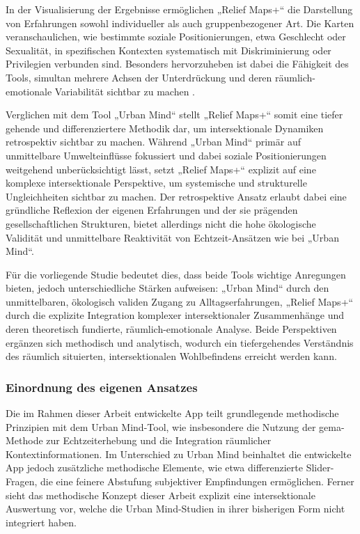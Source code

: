 In der Visualisierung der Ergebnisse ermöglichen „Relief Maps+“ die Darstellung von Erfahrungen sowohl individueller als auch gruppenbezogener Art. Die Karten veranschaulichen, wie bestimmte soziale Positionierungen, etwa Geschlecht oder Sexualität, in spezifischen Kontexten systematisch mit Diskriminierung oder Privilegien verbunden sind. Besonders hervorzuheben ist dabei die Fähigkeit des Tools, simultan mehrere Achsen der Unterdrückung und deren räumlich-emotionale Variabilität sichtbar zu machen \parencite{rodo-de-zarateDevelopingGeographiesIntersectionality2014}.

Verglichen mit dem Tool „Urban Mind“ stellt „Relief Maps+“ somit eine tiefer gehende und differenziertere Methodik dar, um intersektionale Dynamiken retrospektiv sichtbar zu machen. Während „Urban Mind“ primär auf unmittelbare Umwelteinflüsse fokussiert und dabei soziale Positionierungen weitgehend unberücksichtigt lässt, setzt „Relief Maps+“ explizit auf eine komplexe intersektionale Perspektive, um systemische und strukturelle Ungleichheiten sichtbar zu machen. Der retrospektive Ansatz erlaubt dabei eine gründliche Reflexion der eigenen Erfahrungen und der sie prägenden gesellschaftlichen Strukturen, bietet allerdings nicht die hohe ökologische Validität und unmittelbare Reaktivität von Echtzeit-Ansätzen wie bei „Urban Mind“.

Für die vorliegende Studie bedeutet dies, dass beide Tools wichtige Anregungen bieten, jedoch unterschiedliche Stärken aufweisen: „Urban Mind“ durch den unmittelbaren, ökologisch validen Zugang zu Alltagserfahrungen, „Relief Maps+“ durch die explizite Integration komplexer intersektionaler Zusammenhänge und deren theoretisch fundierte, räumlich-emotionale Analyse. Beide Perspektiven ergänzen sich methodisch und analytisch, wodurch ein tiefergehendes Verständnis des räumlich situierten, intersektionalen Wohlbefindens erreicht werden kann.


\subsubsection{Einordnung des eigenen Ansatzes}

Die im Rahmen dieser Arbeit entwickelte App teilt grundlegende methodische Prinzipien mit dem Urban Mind-Tool, wie insbesondere die Nutzung der \gls{gema}-Methode zur Echtzeiterhebung und die Integration räumlicher Kontextinformationen. Im Unterschied zu Urban Mind beinhaltet die entwickelte App jedoch zusätzliche methodische Elemente, wie etwa differenzierte Slider-Fragen, die eine feinere Abstufung subjektiver Empfindungen ermöglichen. Ferner sieht das methodische Konzept dieser Arbeit explizit eine intersektionale Auswertung vor, welche die Urban Mind-Studien in ihrer bisherigen Form nicht integriert haben.

